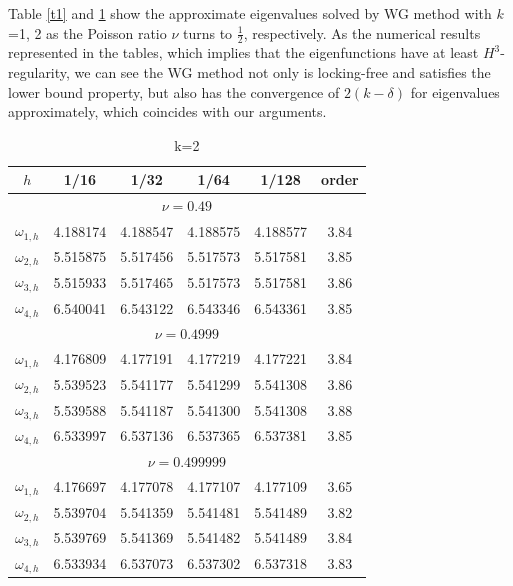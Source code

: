 \documentclass[leqno,CJK]{siamltex704}
\numberwithin{equation}{section}
\begin{document}
Table \ref{t1} and \ref{t2} show the approximate eigenvalues solved by WG method with $k$=1, 2 as the Poisson ratio $\nu$ turns to $\frac{1}{2}$, respectively. As the numerical results represented in the tables, which implies that the eigenfunctions have at least $H^3$-regularity, we can see the WG method not only is locking-free and satisfies the lower bound property, but also has the convergence of $2(k-\delta)$ for eigenvalues approximately, which coincides with our arguments.


\begin{table}[H]
	\begin{center}
		\caption{k=2}\label{t2}
		\begin{tabular}{|c|c|c|c|c|c|}\hline
				$h$&1/16&1/32&1/64&1/128&order\\ \hline\hline
			\multicolumn{6}{|c|}{$\nu=0.49$}\\ \hline
				$\omega_{1,h}$&4.188174 & 4.188547 & 4.188575 & 4.188577 & 3.84 \\  \hline
				$\omega_{2,h}$&5.515875 & 5.517456 & 5.517573 & 5.517581 & 3.85 \\  \hline
				$\omega_{3,h}$&5.515933 & 5.517465 & 5.517573 & 5.517581 & 3.86 \\  \hline
				$\omega_{4,h}$&6.540041 & 6.543122 & 6.543346 & 6.543361 & 3.85 \\  \hline
			\multicolumn{6}{|c|}{$\nu=0.4999$}\\ \hline
				$\omega_{1,h}$&4.176809 & 4.177191 & 4.177219 & 4.177221 & 3.84 \\\hline
				$\omega_{2,h}$&5.539523 & 5.541177 & 5.541299 & 5.541308 & 3.86 \\\hline
				$\omega_{3,h}$&5.539588 & 5.541187 & 5.541300 & 5.541308 & 3.88 \\\hline
				$\omega_{4,h}$&6.533997 & 6.537136 & 6.537365 & 6.537381 & 3.85 \\\hline
			\multicolumn{6}{|c|}{$\nu=0.499999$}\\ \hline
			$\omega_{1,h}$&4.176697 & 4.177078 & 4.177107 & 4.177109 & 3.65 \\
			\hline
			$\omega_{2,h}$&5.539704 & 5.541359 & 5.541481 & 5.541489 & 3.82 \\
			\hline
			$\omega_{3,h}$&5.539769 & 5.541369 & 5.541482 & 5.541489 & 3.84 \\
			\hline
			$\omega_{4,h}$&6.533934 & 6.537073 & 6.537302 & 6.537318 & 3.83 \\ \hline
		\end{tabular}
	\end{center}
\end{table}
\end{document}
